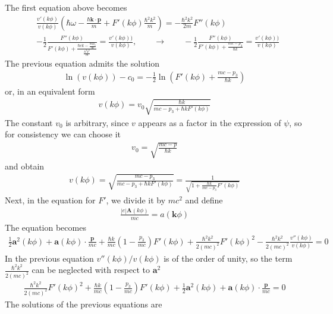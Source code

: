 The first equation above becomes
\begin{align}
     & \frac{v'(k\phi)}{v(k\phi)}\left(\hbar\omega-\frac{\hbar {\bm k}\cdot{\bm p}}{m}+F'(k\phi)\frac{\hbar^2k^2}{m}\right)=-\frac{\hbar^2k^2}{2m}F''(k\phi)                                                                                         \\
     & -\frac12\frac{F''(k\phi)}{F'(k\phi)+\frac{\hbar ck-\frac{\hbar kp_3}{m}}{\frac{\hbar^2k^2}{m}}}=\frac{v'(k\phi))}{v(k\phi)},\qquad \rightarrow\qquad -\frac12\frac{F''(k\phi)}{F'(k\phi)+\frac{ mc-p_3}{\hbar k}}=\frac{v'(k\phi))}{v(k\phi)}
\end{align}
The previous equation admits the  solution
\begin{align}
    \ln(v(k\phi))-c_0=-\frac12\ln(F'(k\phi)+\frac{mc-p_3}{\hbar k})
\end{align}
or,  in an equivalent form
\begin{align}
    v(k\phi)={v_0}\sqrt{\frac{\hbar k}{mc -p_3 +\hbar kF'(k\phi)}}
\end{align}
The constant $v_0$ is arbitrary, since $v$ appears as a factor in the expression of $\psi$, so for consistency we can choose it
\begin{align}
    v_0=\sqrt{\frac{mc-p}{\hbar k}}
\end{align}
and obtain
\begin{align}
    v(k\phi) = \sqrt{\frac{mc -p_3}{mc-p_3+\hbar k F'(k\phi)}}=\frac1{\sqrt{1+\frac{\hbar k}{mc-p_3}F'(k\phi)}}
\end{align}
Next, in the equation  for $F'$, we divide it by $mc^2$  and define
\begin{align}
    \frac{|e|{\bm A}(k\phi)}{mc}=a({\bm k}\phi)
\end{align}
The equation becomes
\begin{align}
    \frac12{\bm a}^2(k\phi)+{\bm a}(k\phi)\cdot\frac{\bm p}{mc}+\frac{\hbar k}{mc}\left(1-\frac{p_3}{mc}\right)F'(k\phi)+\frac{\hbar^2k^2}{2(mc)^2}F'(k\phi)^2-\frac{\hbar^2k^2}{2(mc)^2}\frac{v''(k\phi)}{v(k\phi)}=0
\end{align}
In the previous equation $v''(k\phi)/v(k\phi)$ is of the order of unity, so the term $\frac{\hbar^2k^2}{2(mc)^2}$ can be neglected with respect to ${\bm a}^2$
\begin{align}
    \frac{\hbar^2k^2}{2(mc)^2}F'(k\phi)^2 +\frac{\hbar k}{mc}\left(1-\frac{p_3}{mc}\right)F'(k\phi)+   \frac12{\bm a}^2(k\phi)+{\bm a}(k\phi)\cdot\frac{\bm p}{mc}=0
\end{align}
The solutions of the previous equations are
